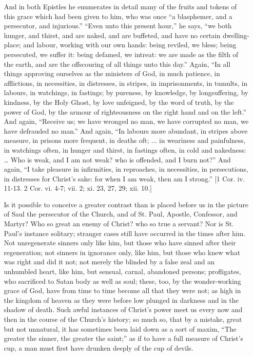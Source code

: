 And in both Epistles he enumerates in detail many of the fruits and
tokens of this grace which had been given to him, who was once ``a
blasphemer, and a persecutor, and injurious.'' ``Even unto
this present hour,'' he says, ``we both hunger, and thirst,
and are naked, and are buffeted, and have no certain dwelling-place;
and labour, working with our own hands: being reviled, we bless; being
persecuted, we suffer it: being defamed, we intreat: we are made as
the filth of the earth, and are the offscouring of all things unto
this day.'' Again, ``In all things approving ourselves as the
ministers of God, in much patience, in afflictions, in necessities, in
distresses, in stripes, in imprisonments, in tumults, in labours, in
watchings, in fastings; by pureness, by knowledge, by longsuffering,
by kindness, by the Holy Ghost, by love unfeigned, by the word of
truth, by the power of God, by the armour of righteousness on the
right hand and on the left.'' And again, ``Receive us; we have
wronged no man, we have corrupted no man, we have defrauded no
man.'' And again, ``In labours more abundant, in stripes above
measure, in prisons more frequent, in deaths oft; ... in weariness and
painfulness, in watchings often, in hunger and thirst, in fastings
often, in cold and nakedness: … Who is weak, and I am not weak? who
is offended, and I burn not?'' And again, ``I take pleasure in
infirmities, in reproaches, in necessities, in persecutions, in
distresses for Christ's sake: for when I am weak, then am I
strong.'' [1 Cor. iv. 11-13. 2 Cor. vi. 4-7; vii. 2; xi. 23, 27,
29; xii. 10.]

Is it possible to conceive a greater contrast than is placed before
us in the picture of Saul the persecutor of the Church, and of St.
Paul, Apostle, Confessor, and Martyr? Who so great an enemy of Christ?
who so true a servant? Nor is St. Paul's instance solitary; stranger
cases still have occurred in the times after him. Not unregenerate
sinners only like him, but those who have sinned after their
regeneration; not sinners in ignorance only, like him, but those who
knew what was right and did it not; not merely the blinded by a false
zeal and an unhumbled heart, like him, but sensual, carnal, abandoned
persons; profligates, who sacrificed to Satan body as well as soul;
these, too, by the wonder-working grace of God, have from time to time
become all that they were not; as high in the kingdom of heaven as
they were before low plunged in darkness and in the shadow of death.
Such awful instances of Christ's power meet us every now and then in
the course of the Church's history; so much so, that by a mistake,
great but not unnatural, it has sometimes been laid down as a sort of
maxim, ``The greater the sinner, the greater the saint;'' as
if to have a full measure of Christ's cup, a man must first have
drunken deeply of the cup of devils.

